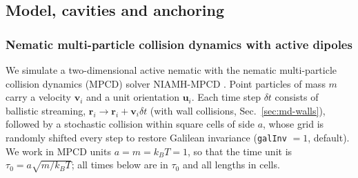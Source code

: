 
\subsection{Model, cavities and anchoring}
\label{sec:md-model}

\subsubsection{Nematic multi-particle collision dynamics with active dipoles}
\label{sec:md-mpcd}

We simulate a two-dimensional active nematic with the nematic multi-particle collision
dynamics (MPCD) solver NIAMH-MPCD
\cite{TODO_nematicMPCD,TODO_activeMPCD,TODO_Kozhukhov2024}.
Point particles of mass $m$ carry a velocity $\mathbf v_i$ and a unit orientation $\mathbf u_i$.
Each time step $\delta t$ consists of ballistic streaming, $\mathbf r_i\to\mathbf r_i+\mathbf v_i\delta t$
(with wall collisions, Sec.~\ref{sec:md-walls}), followed by a stochastic collision within
square cells of side $a$, whose grid is randomly shifted every step to restore Galilean
invariance (\texttt{galInv} $=1$, default). We work in MPCD units $a=m=k_BT=1$, so that the time unit is
$\tau_0=a\sqrt{m/k_BT}$; all times below are in $\tau_0$ and all lengths in cells.

